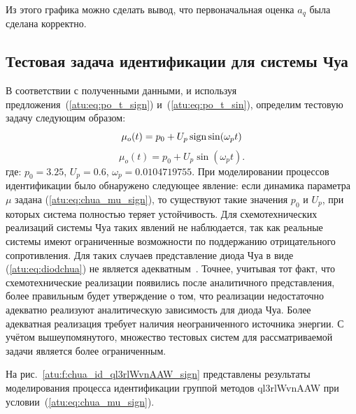 Из этого графика можно сделать вывод, что первоначальная оценка $a_q$
была сделана корректно.


\subsection{Тестовая задача идентификации для системы Чуа}  %

В соответствии с полученными данными, и используя
предложения~(\ref{atu:eq:po_t_sign}) и~(\ref{atu:eq:po_t_sin}),
определим тестовую задачу следующим образом:
%
\begin{equation}
 \mu_o(t) = p_0 + U_p \operatorname*{sign} \sin( \omega_p t )
  \label{atu:eq:chua_mu_sign}
\end{equation}
%
\begin{equation}
 \mu_o(t) = p_0 + U_p \sin( \omega_p t ).
  \label{atu:eq:chua_mu_sin}
\end{equation}
%
где:
$p_0 = 3.25$, $U_p=0.6$, $\omega_p=0.0104719755$.
При моделировании процессов идентификации было обнаружено
следующее явление: если динамика параметра $\mu$ задана (\ref{atu:eq:chua_mu_sign}),
то существуют такие значения $p_0$ и $U_p$,
при которых система полностью теряет устойчивость.
Для схемотехнических реализаций системы Чуа таких явлений
не наблюдается, так как реальные системы имеют ограниченные возможности
по поддержанию отрицательного сопротивления. Для таких случаев
представление диода Чуа в виде (\ref{atu:eq:diodchua})
не является адекватным~\cite{atu_kher2014}. Точнее, учитывая тот факт,
что схемотехнические реализации появились после аналитичного представления,
более правильным будет утверждение о том, что реализации недостаточно адекватно
реализуют аналитическую зависимость для диода Чуа.
Более адекватная реализация требует наличия неограниченного
источника энергии. С учётом вышеупомянутого,
множество тестовых систем для рассматриваемой задачи
является более ограниченным.

На рис.~\ref{atu:f:chua_id_ql3rlWvnAAW_sign} представлены результаты
моделирования процесса идентификации
группой методов ql3rlWvnAAW при условии~(\ref{atu:eq:chua_mu_sign}).

